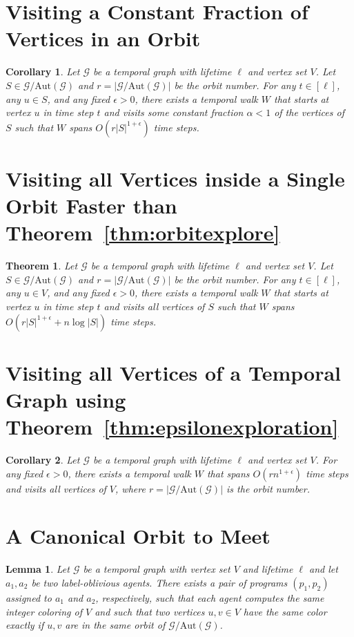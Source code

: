 \documentclass[10pt,a4paper]{article}
\newtheorem{theorem}{Theorem}[section]
\newtheorem{lemma}{Lemma}[section]
\newtheorem{corollary}{Corollary}[section]
\newcommand{\auttg}{\ensuremath{\text{Aut}(\mathcal{G})}}
\newcommand{\torb}{\ensuremath{\mathcal{G}/\auttg}}
\begin{document}
{\section{Visiting a Constant Fraction of Vertices in an Orbit}
\begin{corollary}\label{cor:tinyfraction} Let $\mathcal{G}$ be a temporal graph
    with lifetime $\ell$ and vertex set $V$. Let $S \in \torb$ and $r=|\torb|$
    be the orbit number. For any $t\in[\ell]$, any $u \in S$, and any fixed
    $\epsilon > 0$,  there exists a temporal walk $W$ that starts at vertex $u$
    in time step $t$ and visits some constant fraction $\alpha < 1$  
    of the vertices of
    $S$ such that 
    $W$ spans $O(r|S|^{1+\epsilon})$ time steps.     
\end{corollary}
\prooftinyfraction

\section{Visiting all Vertices inside a Single Orbit Faster than Theorem~\ref{thm:orbitexplore}}
\begin{theorem} Let $\mathcal{G}$ be a temporal
    graph with lifetime $\ell$ and vertex set $V$. Let $S \in \torb$ and
    $r=|\torb|$ be the orbit number. For any $t\in[\ell]$, any $u \in V$, and
    any fixed $\epsilon > 0$, there exists a temporal walk $W$ that starts at
    vertex $u$ in time step $t$ and visits all vertices of $S$ such that $W$
    spans $O(r|S|^{1+\epsilon} + n \log |S|)$ time steps.
\end{theorem}
\proofepsilonexploration

\section{Visiting all Vertices of a Temporal Graph using Theorem~\ref{thm:epsilonexploration}}
\begin{corollary} Let $\mathcal{G}$ be a temporal
    graph with lifetime $\ell$ and vertex set $V$.
    For any fixed $\epsilon>0$, there exists a temporal walk
    $W$ that spans $O(r n^{1+\epsilon})$ time steps and visits all vertices of
    $V$, where $r=|\torb|$ is the orbit number.
\end{corollary}
\proofepsilonallorbits

\section{A Canonical Orbit to Meet}
\begin{lemma}\label{lem:meeting} Let $\mathcal{G}$ be a temporal graph with
    vertex set $V$ and lifetime $\ell$ and let $a_1, a_2$ be two label-oblivious
    agents. There exists a pair of programs $(p_1, p_2)$ assigned to $a_1$ and
    $a_2$, respectively, such that each agent computes the same integer coloring
    of $V$ and such that two vertices $u, v \in V$ have the same color exactly
    if $u, v$ are in the same orbit of $\mathcal{G}/{\text{Aut}(\mathcal{G})}$.
\end{lemma}
\proofmeeting

}
\end{document}
